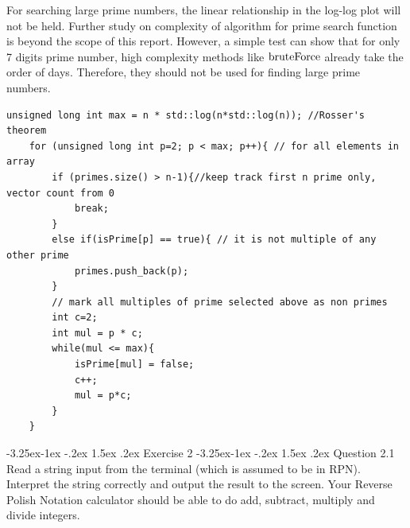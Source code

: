 \documentclass[a4paper,12pt]{article}%
\makeatletter
\renewcommand\section{\@startsection{section}{2}{\z@}%
                                     {-3.25ex\@plus -1ex \@minus -.2ex}%
                                     {1.5ex \@plus .2ex}%
                                     {\normalfont\large\bfseries}}%
\renewcommand\subsection{\@startsection{subsection}{2}{\z@}%
                                     {-3.25ex\@plus -1ex \@minus -.2ex}%
                                     {1.5ex \@plus .2ex}%
                                     {\normalfont\bfseries}}
\makeatother
\begin{document}
For searching large prime numbers, the linear relationship in the log-log plot will not be held. Further study on complexity of algorithm for prime search function is beyond the scope of this report. However, a simple test can show that for only 7 digits prime number, high complexity methods like $\lstinline{bruteForce}$ already take the order of days. Therefore, they should not be used for finding large prime numbers. 
\begin{lstlisting}[title = $\lstinline{Eratosthenes}$]
	unsigned long int max = n * std::log(n*std::log(n)); //Rosser's theorem
    for (unsigned long int p=2; p < max; p++){ // for all elements in array
        if (primes.size() > n-1){//keep track first n prime only, vector count from 0
            break;
        }
        else if(isPrime[p] == true){ // it is not multiple of any other prime
            primes.push_back(p);
        }
        // mark all multiples of prime selected above as non primes
        int c=2;
        int mul = p * c;
        while(mul <= max){
            isPrime[mul] = false;
            c++;
            mul = p*c;
        }        
    }
\end{lstlisting}
\section{Exercise 2}
\subsection{Question 2.1}
Read a string input from the terminal (which is assumed to be in RPN). Interpret the string
correctly and output the result to the screen.
Your Reverse Polish Notation calculator should be able to do add, subtract, multiply and
divide integers.
\end{document}
